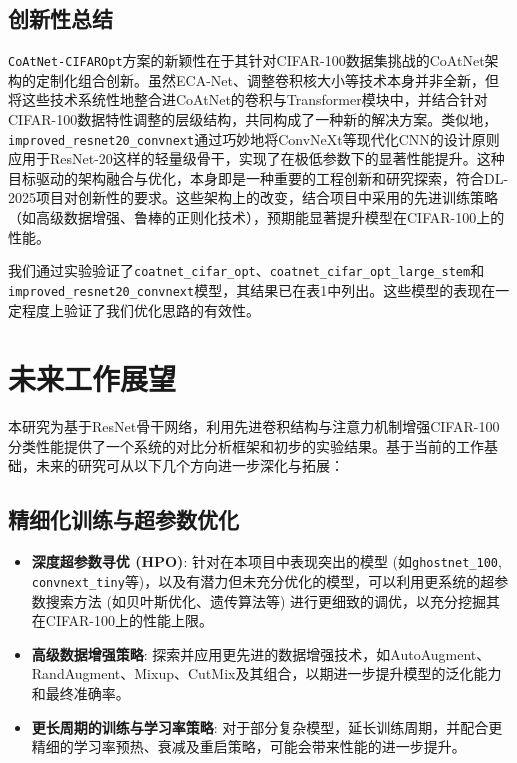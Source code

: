 \documentclass[a4paper]{article}
\begin{document}
\subsection{创新性总结}
\texttt{CoAtNet-CIFAROpt}方案的新颖性在于其针对CIFAR-100数据集挑战的CoAtNet架构的定制化组合创新。虽然ECA-Net、调整卷积核大小等技术本身并非全新，但将这些技术系统性地整合进CoAtNet的卷积与Transformer模块中，并结合针对CIFAR-100数据特性调整的层级结构，共同构成了一种新的解决方案。类似地，\texttt{improved\_resnet20\_convnext}通过巧妙地将ConvNeXt等现代化CNN的设计原则应用于ResNet-20这样的轻量级骨干，实现了在极低参数下的显著性能提升。这种目标驱动的架构融合与优化，本身即是一种重要的工程创新和研究探索，符合DL-2025项目对创新性的要求。这些架构上的改变，结合项目中采用的先进训练策略（如高级数据增强、鲁棒的正则化技术），预期能显著提升模型在CIFAR-100上的性能。

我们通过实验验证了\texttt{coatnet\_cifar\_opt}、\texttt{coatnet\_cifar\_opt\_large\_stem}和\texttt{improved\_resnet20\_convnext}模型，其结果已在表1中列出。这些模型的表现在一定程度上验证了我们优化思路的有效性。

\section{未来工作展望}

本研究为基于ResNet骨干网络，利用先进卷积结构与注意力机制增强CIFAR-100分类性能提供了一个系统的对比分析框架和初步的实验结果。基于当前的工作基础，未来的研究可从以下几个方向进一步深化与拓展：

\subsection{精细化训练与超参数优化}
\begin{itemize}
    \item \textbf{深度超参数寻优 (HPO)}: 针对在本项目中表现突出的模型 (如\texttt{ghostnet\_100}, \texttt{convnext\_tiny}等)，以及有潜力但未充分优化的模型，可以利用更系统的超参数搜索方法 (如贝叶斯优化、遗传算法等) 进行更细致的调优，以充分挖掘其在CIFAR-100上的性能上限。
    \item \textbf{高级数据增强策略}: 探索并应用更先进的数据增强技术，如AutoAugment、RandAugment、Mixup、CutMix及其组合，以期进一步提升模型的泛化能力和最终准确率。
    \item \textbf{更长周期的训练与学习率策略}: 对于部分复杂模型，延长训练周期，并配合更精细的学习率预热、衰减及重启策略，可能会带来性能的进一步提升。
\end{itemize}
\end{document}
